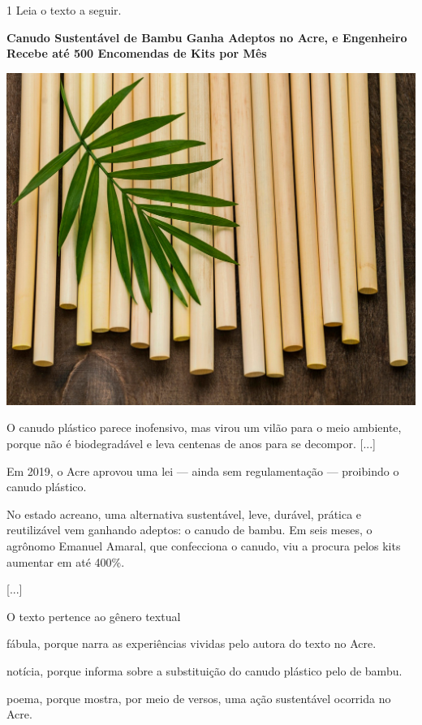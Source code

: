 \begin{conteudo}
\begin{conteudo}
\begin{conteudo}
\begin{conteudo}
\num{1} Leia o texto a seguir.

\begin{myquote}
\textbf{Canudo Sustentável de Bambu Ganha Adeptos no Acre, e Engenheiro
Recebe até 500 Encomendas de Kits por Mês}

\begin{center}
\noindent\includegraphics[width=.4\textwidth]{media/image20c.jpg}
\end{center}

O canudo plástico parece inofensivo, mas virou um vilão para o meio
ambiente, porque não é biodegradável e leva centenas de anos para se
decompor. {[}...{]}

Em 2019, o Acre aprovou uma lei --- ainda sem regulamentação ---
proibindo o canudo plástico.

No estado acreano, uma alternativa sustentável, leve, durável, prática e
reutilizável vem ganhando adeptos: o canudo de bambu. Em seis meses, o
agrônomo Emanuel Amaral, que confecciona o canudo, viu a procura pelos
kits aumentar em até 400\%.

{[}...{]}

\end{myquote} 

O texto pertence ao gênero textual

\begin{escolha}
\item fábula, porque narra as experiências vividas pelo autora do texto no Acre.

\item notícia, porque informa sobre a substituição do canudo plástico pelo de bambu.

\item poema, porque mostra, por meio de versos, uma ação sustentável ocorrida no Acre.


\end{escolha}
\end{conteudo}
\end{conteudo}
\end{conteudo}
\end{conteudo}
